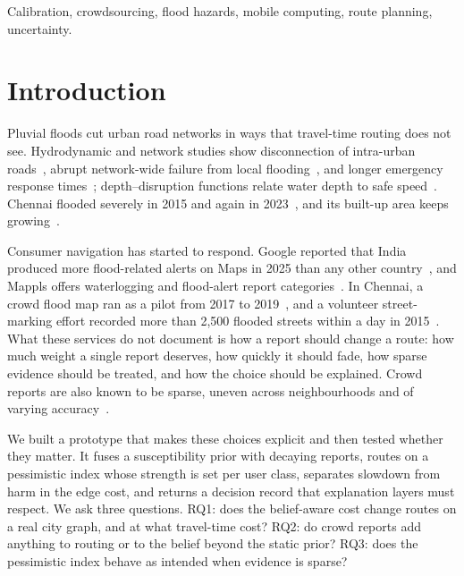 \documentclass[conference]{IEEEtran}
\begin{document}
\begin{IEEEkeywords}
Calibration, crowdsourcing, flood hazards, mobile computing, route planning, uncertainty.
\end{IEEEkeywords}

\section{Introduction}
Pluvial floods cut urban road networks in ways that travel-time routing does not see. Hydrodynamic and network studies show disconnection of intra-urban roads~\cite{yin2016shanghai,zhou2022connectivity}, abrupt network-wide failure from local flooding~\cite{wang2019percolation}, and longer emergency response times~\cite{green2017emergency,coles2017york}; depth--disruption functions relate water depth to safe speed~\cite{pregnolato2017depth}. Chennai flooded severely in 2015 and again in 2023~\cite{vanoldenborgh2016chennai,radhakrishnan2024chennai}, and its built-up area keeps growing~\cite{devi2019sprawl}.

Consumer navigation has started to respond. Google reported that India produced more flood-related alerts on Maps in 2025 than any other country~\cite{ramani2025maps}, and Mappls offers waterlogging and flood-alert report categories~\cite{mappls2026post}. In Chennai, a crowd flood map ran as a pilot from 2017 to 2019~\cite{urbanrisklab2019riskmap}, and a volunteer street-marking effort recorded more than 2,500 flooded streets within a day in 2015~\cite{naik2016flooded}. What these services do not document is how a report should change a route: how much weight a single report deserves, how quickly it should fade, how sparse evidence should be treated, and how the choice should be explained. Crowd reports are also known to be sparse, uneven across neighbourhoods and of varying accuracy~\cite{senaratne2017vgi,esparza2023imbalance,liu2023wazecoverage}.

We built a prototype that makes these choices explicit and then tested whether they matter. It fuses a susceptibility prior with decaying reports, routes on a pessimistic index whose strength is set per user class, separates slowdown from harm in the edge cost, and returns a decision record that explanation layers must respect. We ask three questions. RQ1: does the belief-aware cost change routes on a real city graph, and at what travel-time cost? RQ2: do crowd reports add anything to routing or to the belief beyond the static prior? RQ3: does the pessimistic index behave as intended when evidence is sparse?
\end{document}
